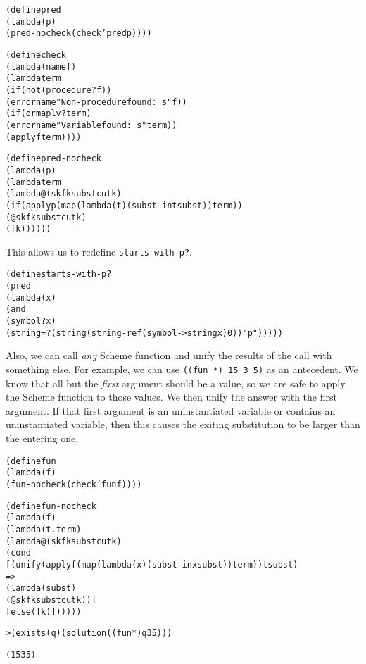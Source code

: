 \begin{alltt}
(define pred             
  (lambda (p)
    (pred-nocheck (check 'pred p))))

(define check
  (lambda (name f)
    (lambda term
      (if (not (procedure? f))
          (error name "Non-procedure found: ~s" f))
      (if (ormap lv? term)
          (error name "Variable found: ~s" term))
      (apply f term))))
\end{alltt}

\begin{alltt}
(define pred-nocheck
  (lambda (p)
    (lambda term
      (lambda@ (sk fk subst cutk)
        (if (apply p (map (lambda (t) (subst-in t subst)) term))
          (@ sk fk subst cutk)
          (fk))))))
\end{alltt}

\noindent
This allows us to redefine \texttt{starts-with-p?}.

\begin{alltt}
(define starts-with-p?
  (pred
    (lambda (x)
      (and
        (symbol? x)
        (string=? (string (string-ref (symbol->string x) 0)) "p")))))
\end{alltt}

Also, we can call \emph{any} Scheme function and unify the results of
the call with something else.  For example, we can use \texttt{((fun
*) 15 3 5)} as an antecedent.  We know that all but the \emph{first}
argument should be a value, so we are safe to apply the Scheme
function to those values.  We then unify the answer with the first
argument.  If that first argument is an uninstantiated variable or
contains an uninstantiated variable, then this causes the exiting
substitution to be larger than the entering one.

\begin{alltt}
(define fun    
  (lambda (f)
    (fun-nocheck (check 'fun f))))
\end{alltt}

\begin{alltt}
(define fun-nocheck
  (lambda (f)
    (lambda (t . term)
      (lambda@ (sk fk subst cutk)
        (cond
          [(unify (apply f (map (lambda (x) (subst-in x subst)) term)) t subst)
           =>
           (lambda (subst)
             (@ sk fk subst cutk))]
          [else (fk)])))))
\end{alltt}

\begin{alltt}
> (exists (q) (solution ((fun *) q 3 5)))

(15 3 5)
\end{alltt}

